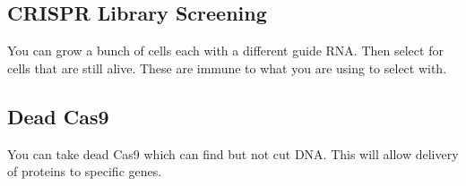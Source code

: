 \documentclass{article}
\begin{document}
\subsection{CRISPR Library Screening}

You can grow a bunch of cells each with a different guide RNA. Then select for
cells that are still alive. These are immune to what you are using to select
with.

\subsection{Dead Cas9}

You can take dead Cas9 which can find but not cut DNA. This will allow delivery
of proteins to specific genes.
\end{document}
